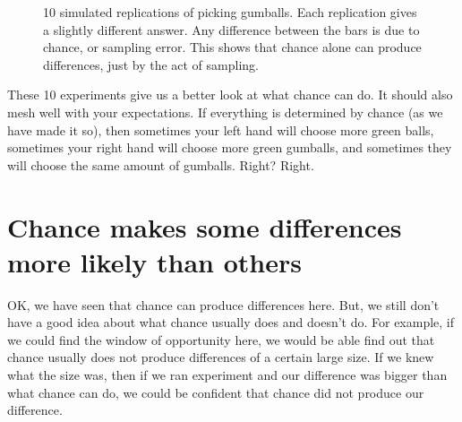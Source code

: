 \documentclass[
  letterpaper,
  DIV=11,
  numbers=noendperiod]{scrreprt}
\begin{document}
\begin{figure}


\caption{\label{fig-5gumballsims}10 simulated replications of picking
gumballs. Each replication gives a slightly different answer. Any
difference between the bars is due to chance, or sampling error. This
shows that chance alone can produce differences, just by the act of
sampling.}

\end{figure}%

These 10 experiments give us a better look at what chance can do. It
should also mesh well with your expectations. If everything is
determined by chance (as we have made it so), then sometimes your left
hand will choose more green balls, sometimes your right hand will choose
more green gumballs, and sometimes they will choose the same amount of
gumballs. Right? Right.

\section{Chance makes some differences more likely than
others}\label{chance-makes-some-differences-more-likely-than-others}

OK, we have seen that chance can produce differences here. But, we still
don't have a good idea about what chance usually does and doesn't do.
For example, if we could find the window of opportunity here, we would
be able find out that chance usually does not produce differences of a
certain large size. If we knew what the size was, then if we ran
experiment and our difference was bigger than what chance can do, we
could be confident that chance did not produce our difference.
\end{document}
